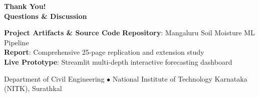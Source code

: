\documentclass[aspectratio=169, 10pt]{beamer}
\begin{document}
\begin{frame}[plain]
    \centering
    \vspace{1.0cm}
    {\Huge \textbf{\color{primaryblue}Thank You!}}\\[0.6cm]
    {\large \textbf{Questions \& Discussion}}\\[1.0cm]
    
    \begin{block}{\centering \textbf{Project Artifacts \& Source Code}}
        \centering
        \footnotesize
        \textbf{Repository}: Mangaluru Soil Moisture ML Pipeline\\
        \textbf{Report}: Comprehensive 25-page replication and extension study\\
        \textbf{Live Prototype}: Streamlit multi-depth interactive forecasting dashboard
    \end{block}
    
    \vspace{0.4cm}
    \footnotesize
    Department of Civil Engineering $\bullet$ National Institute of Technology Karnataka (NITK), Surathkal
\end{frame}
\end{document}
